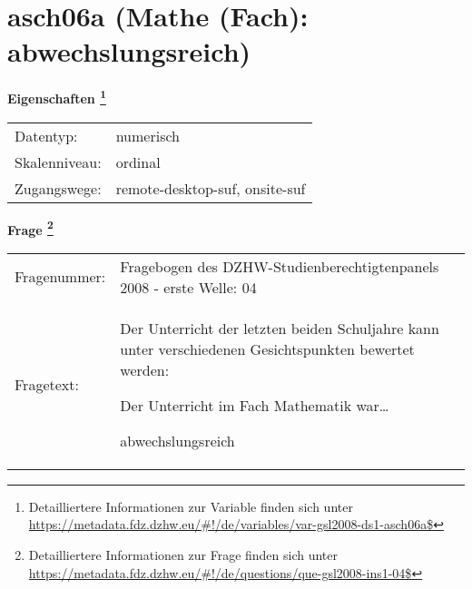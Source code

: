 
    \setcounter{footnote}{0}

    \vspace*{-1.8cm}
	\section{asch06a (Mathe (Fach): abwechslungsreich)}
	\label{section:asch06a}



    \vspace*{0.5cm}
    \noindent\textbf{Eigenschaften
	\footnote{Detailliertere Informationen zur Variable finden sich unter
		\url{https://metadata.fdz.dzhw.eu/\#!/de/variables/var-gsl2008-ds1-asch06a$}}}\\
	\begin{tabularx}{\hsize}{@{}lX}
	Datentyp: & numerisch \\
	Skalenniveau: & ordinal \\
	Zugangswege: &
	  remote-desktop-suf, 
	  onsite-suf
 \\
    \end{tabularx}



				\vspace*{0.5cm}
                \noindent\textbf{Frage
	                \footnote{Detailliertere Informationen zur Frage finden sich unter
		              \url{https://metadata.fdz.dzhw.eu/\#!/de/questions/que-gsl2008-ins1-04$}}}\\
				\begin{tabularx}{\hsize}{@{}lX}
					Fragenummer: &
					  Fragebogen des DZHW-Studienberechtigtenpanels 2008 - erste Welle:
					  04
 \\
					Fragetext: & Der Unterricht der letzten beiden Schuljahre kann unter verschiedenen Gesichtspunkten bewertet werden:\par  Der Unterricht im Fach Mathematik war…\par  abwechslungsreich \\
				\end{tabularx}





